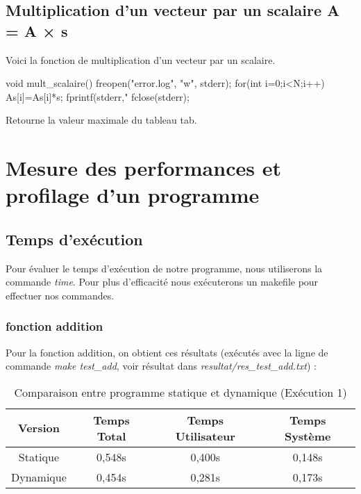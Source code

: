 \documentclass{rapport}
\begin{document}
      \subsection{Multiplication d’un vecteur par un scalaire A = A × s}
        Voici la fonction de multiplication d'un vecteur par un scalaire.
        \begin{algorithm}
        \begin{C}
void mult_scalaire(){
    freopen("error.log", "w", stderr);
    for(int i=0;i<N;i++){
        As[i]=As[i]*s;
        fprintf(stderr,"%
    }
    fclose(stderr);
}
        \end{C}
        \caption[Algo en C]{Retourne la valeur maximale du tableau tab.\label{ag:algoc}}
      \end{algorithm}
    
    \section{Mesure des performances et profilage d’un programme}
    \subsection{Temps d'exécution}
      Pour évaluer le temps d'exécution de notre programme, nous utiliserons la commande \textit{time}.
      Pour plus d'efficacité nous exécuterons un makefile pour effectuer nos commandes.
      
    \subsubsection{fonction addition}
      Pour la fonction addition, on obtient ces résultats (exécutés avec la ligne de commande \textit{make test\_add}, voir résultat dans \textit{resultat/res\_test\_add.txt}) :
     
    \begin{table}[h!]
    \centering
    \begin{tabular}{|c|c|c|c|}
        \hline
        Version & Temps Total & Temps Utilisateur & Temps Système \\
        \hline
        Statique & 0,548s & 0,400s & 0,148s \\
        \hline
        Dynamique & 0,454s & 0,281s & 0,173s \\
        \hline
    \end{tabular}
    \caption{Comparaison entre programme statique et dynamique (Exécution 1)}
\end{table}
\end{document}
